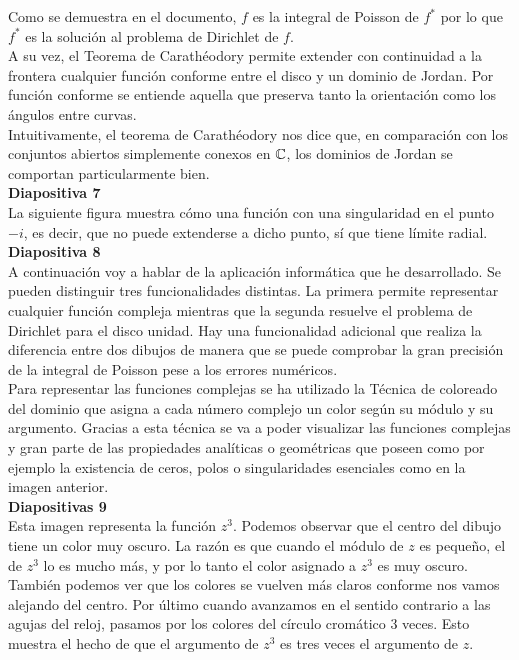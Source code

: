 \documentclass[spanish, a4paper, 12pt]{article}
\begin{document}
Como se demuestra en el documento, $f$ es la integral de Poisson de $f^*$ por lo que $f^*$ es la solución al problema de Dirichlet de $f$. \\

A su vez, el Teorema de Carathéodory permite extender con continuidad a la frontera cualquier función conforme entre el disco y un dominio de Jordan. Por función conforme se entiende aquella que preserva tanto la orientación como los ángulos entre curvas.\\

Intuitivamente, el teorema de Carathéodory nos dice que, en comparación con los conjuntos abiertos simplemente conexos en $\mathbb{C}$, los dominios de Jordan se comportan particularmente bien. \\

\textbf{Diapositiva 7} \\

La siguiente figura muestra cómo una función con una singularidad en el punto $-i$, es decir, que no puede extenderse a dicho punto, sí que tiene límite radial. \\

\textbf{Diapositiva 8} \\

A continuación voy a hablar de la aplicación informática que he desarrollado. Se pueden distinguir tres funcionalidades distintas. La primera permite representar cualquier función compleja mientras que la segunda resuelve el problema de Dirichlet para el disco unidad. Hay una funcionalidad adicional que realiza la diferencia entre dos dibujos de manera que se puede comprobar la gran precisión de la integral de Poisson pese a los errores numéricos. \\

Para representar las funciones complejas se ha utilizado la Técnica de coloreado del dominio que asigna a cada número complejo un color según su módulo y su argumento. Gracias a esta técnica se va a poder visualizar las funciones complejas y gran parte de las propiedades analíticas o geométricas que poseen como por ejemplo la existencia de ceros, polos o singularidades esenciales como en la imagen anterior. \\

\textbf{Diapositivas 9} \\

Esta imagen representa la función $z^3$. Podemos observar que el centro del dibujo tiene un color muy oscuro. La razón es que cuando el módulo de $z$ es pequeño, el de $z^3$ lo es mucho más, y por lo tanto el color asignado a $z^3$ es muy oscuro. También podemos ver que los colores se vuelven más claros conforme nos vamos alejando del centro. Por último cuando avanzamos en el sentido contrario a las agujas del reloj, pasamos por los colores del círculo cromático $3$ veces. Esto muestra el hecho de que el argumento de $z^3$ es tres veces el argumento de $z$. \\
\end{document}
